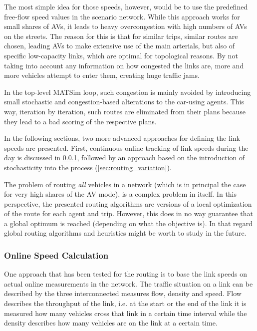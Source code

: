 The most simple idea for those speeds, however, would be to use the predefined free-flow speed values in
the scenario network. While this approach works for small shares of AVs, it leads
to heavy overcongestion with high numbers of AVs on the streets. The reason
for this is that for similar trips, similar routes are chosen, leading AVs to make
extensive use of the main arterials, but also of specific low-capacity links, which
are optimal for topological reasons. By not taking into account any information
on how congested the links are, more and more vehicles attempt to enter
them, creating huge traffic jams.

In the top-level MATSim loop, such congestion is mainly avoided by introducing
small stochastic and congestion-based alterations to the car-using agents. This way,
iteration by iteration, such routes are eliminated from their plans because they
lead to a bad scoring of the respective plans.

In the following sections, two more advanced approaches for defining the link speeds
are presented. First, continuous online tracking of link speeds during the day is
discussed in \cref{sec:routing_online}, followed by an approach based on the
introduction of stochasticity into the process (\cref{sec:routing_variation}).

The problem of routing \textit{all} vehicles in a network (which is
in principal the case for very high shares of the AV mode), is a complex problem
in itself. In this perspective, the presented routing algorithms are versions of
a local optimization of the route for each agent and trip. However, this does in
no way guarantee that a global optimum is reached (depending on what the objective
is). In that regard global routing algorithms and heuristics might be worth to study in the future.

\subsubsection{Online Speed Calculation}
\label{sec:routing_online}

One approach that has been tested for the routing is to base the link speeds on
actual online measurements in the network. The traffic situation on
a link can be described by the three interconnected measures flow,
density and speed. Flow describes the throughput of the link, i.e. at the start
or the end of the link it is measured how many vehicles cross that link in a
certain time interval while the density describes how many vehicles are on
the link at a certain time.


